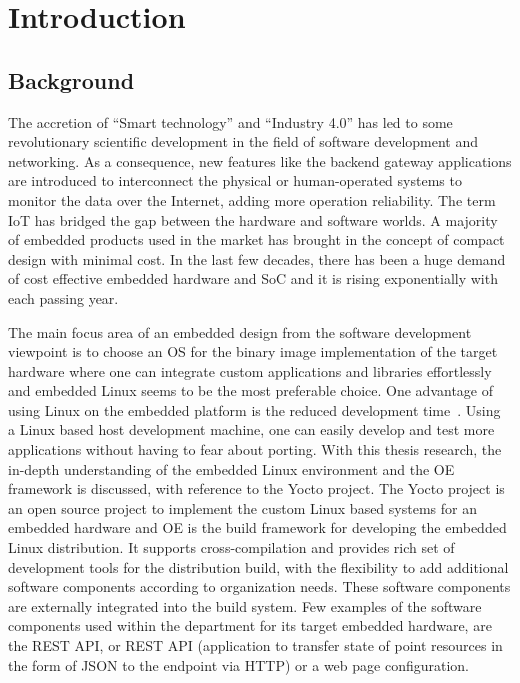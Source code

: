 
\chapter{Introduction} %

\label{chapter:introduction}


\newcommand{\keyword}[1]{\textbf{#1}}
\newcommand{\tabhead}[1]{\textbf{#1}}
\newcommand{\code}[1]{\texttt{#1}}
\newcommand{\file}[1]{\texttt{\bfseries#1}}
\newcommand{\option}[1]{\texttt{\itshape#1}}

\section{Background}
The accretion of \enquote{Smart technology} and \enquote{Industry 4.0} has led to some revolutionary scientific development in the field of software development and networking. As a consequence, new features like the backend gateway applications are introduced to interconnect the physical or human-operated systems to monitor the data over the Internet, adding more operation reliability. The term \ac{IoT} has bridged the gap between the hardware and software worlds. A majority of embedded products used in the market has brought in the concept of compact design with minimal cost. In the last few decades, there has been a huge demand of cost effective embedded hardware and \ac{SoC} and it is rising exponentially with each passing year. 


The main focus area of an embedded design from the software development viewpoint is to choose an \ac{OS} for the binary image implementation of the target hardware where one can integrate custom applications and libraries effortlessly and embedded Linux seems to be the most preferable choice. One advantage of using Linux on the embedded platform is the reduced development time~\parencite{raghavan2005embedded}. Using a Linux based host development machine, one can easily develop and test more applications without having to fear about porting. With this thesis research, the in-depth understanding of the embedded Linux environment and the \ac{OE} framework is discussed, with reference to the Yocto project. The Yocto project is an open source project to implement the custom Linux based systems for an embedded hardware and \ac{OE} is the build framework for developing the embedded Linux distribution. It supports cross-compilation and provides rich set of development tools for the distribution build, with the flexibility to add additional software components according to organization needs. These software components are externally integrated into the build system. Few examples of the software components used within the department for its target embedded hardware, are the \ac{REST} \ac{API}, or REST API (application to transfer state of point resources in the form of \ac{JSON} to the endpoint via HTTP) or a web page configuration. 

